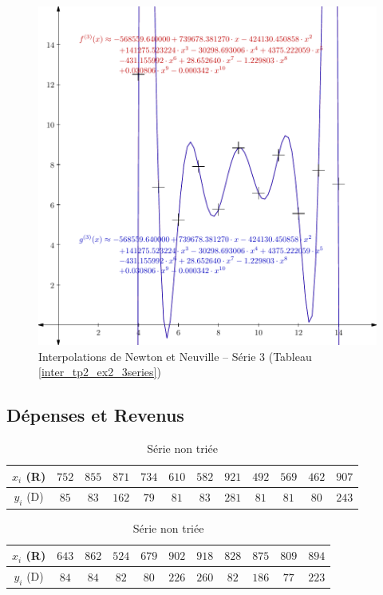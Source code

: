 \documentclass{report}
\begin{document}
	\newpage
	\begin{figure}[h]
	  \centering
 	  \includegraphics[scale=0.5]{graphiques/pdf_output/inter_tp2_ex2_3.pdf}
	  \caption{Interpolations de Newton et Neuville -- Série 3 (Tableau \ref{inter_tp2_ex2_3series})}
	\end{figure}
      \newpage
      \subsection{Dépenses et Revenus}
      \begin{table}[h]
	\begin{tabular}{| c | c | c | c | c | c | c | c | c | c | c | c |}
	  \hline 
	  $x_{i}$ (R) & $752$ & $855$ & $871$ & $734$ & $610$ & $582$ & $921$ & $492$ & $569$ & $462$ & $907 $ \\ 
	  \hline 
	  $y_{i}$ (D) & $85$ & $83$ & $162$ & $79$ & $81$ & $83$ & $281$ & $81$ & $81$ & $80$ & $243 $ \\ 
	  \hline 
	\end{tabular}
	\newline
	\begin{tabular}{| c | c | c | c | c | c | c | c | c | c | c |}
	\hline 
	$x_{i}$ (R) & $643$ & $862$ & $524$ & $679$ & $902$ & $918$ & $828$ & $875$ & $809$ & $894$ \\ 
	\hline 
	$y_{i}$ (D) & $84$ & $84$ & $82$ & $80$ & $226$ & $260$ & $82$ & $186$ & $77$ & $223$ \\ 
	\hline 
	\end{tabular}
	\caption{Série non triée}
	\label{inter_tp2_ex3_depenses}
      \end{table}
      
\end{document}
